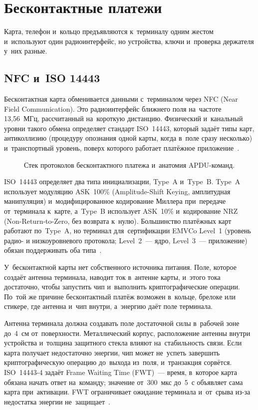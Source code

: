 \chapter{Бесконтактные платежи}\label{ch:contactless}
Карта, телефон и~кольцо предъявляются к~терминалу одним жестом и~используют
один радиоинтерфейс, но устройства, ключи и~проверка держателя у~них разные.

\section{NFC и~ISO 14443}\label{sec:contactless-nfc}

Бесконтактная карта обменивается данными с~терминалом через NFC (Near Field Communication).
Это радиоинтерфейс ближнего поля на~частоте 13,56~МГц, рассчитанный на~короткую
дистанцию. Физический и~канальный уровни такого обмена определяет стандарт
ISO~14443, который задаёт типы карт, антиколлизию (процедуру опознания одной
карты, когда в~поле сразу несколько) и~транспортный уровень, поверх которого
работает платёжное приложение~\cite{iso-14443-1,iso-14443-2,iso-14443-3,iso-14443-4}.

\begin{figure}
  \centering
  \caption{Стек протоколов бесконтактного платежа и~анатомия APDU-команд.}%
  \label{fig:contactless-protocol-stack}
\end{figure}
ISO~14443 определяет два типа инициализации, Type~A и~Type~B. Type~A использует
модуляцию ASK~100\% (Amplitude-Shift Keying, амплитудная манипуляция)
и~модифицированное кодирование Миллера при~передаче от~терминала к~карте,
а~Type~B использует ASK~10\% и~кодирование NRZ (Non-Return-to-Zero, без
возврата к~нулю). Большинство платёжных карт работают по~Type~A, но терминал
для~сертификации EMVCo Level~1 (уровень радио- и низкоуровневого протокола;
Level~2~--- ядро, Level~3~--- приложение) обязан поддерживать оба
типа~\cite{iso-14443-2,emvco-contactless-book-a}.

У~бесконтактной карты нет собственного источника питания. Поле, которое создаёт
антенна терминала, наводит ток в~антенне карты, и~этого тока достаточно, чтобы
запустить чип и~выполнить криптографические операции. По~той же причине
бесконтактный платёж возможен в~кольце, брелоке или стикере, где антенна и~чип
внутри, а~энергию даёт поле терминала.

Антенна терминала должна создавать поле достаточной силы в~рабочей зоне до~4~см
от~поверхности. Металлический корпус, расположение антенны внутри устройства
и~толщина защитного стекла влияют на~стабильность связи. Если карта получает
недостаточно энергии, чип может не~успеть завершить криптографическую операцию
до~выхода из~поля, и~транзакция сорвётся. ISO~14443-4 задаёт Frame Waiting
Time (FWT)~--- время, в~которое карта обязана начать ответ на~команду; значение
от~300~мкс до~5~с объявляет сама карта при~активации. FWT ограничивает ожидание
терминала и~от~срыва из-за недостатка энергии не~защищает~\cite{iso-14443-4,francis-practical-relay-attack}.

